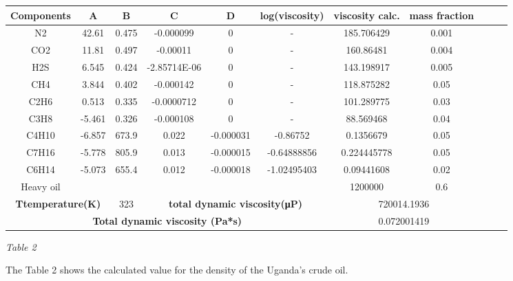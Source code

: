 \documentclass[12pt]{article}
\begin{document}
{\begin{table}[h!]
	\begin{tabular}{|c|c|c|c|c|c|c|c|c|c|c|}
	  \hline
	  \textbf{Components} & \textbf{A} & \textbf{B} & \textbf{C} & \textbf{D} & \textbf{log(viscosity)} & \textbf{viscosity calc.} & \textbf{mass fraction} \\
	  \hline
		N2 & 42.61 & 0.475 & -0.000099 & 0 & - & 185.706429 & 0.001 \\
		\hline
		CO2 & 11.81 & 0.497 & -0.00011 & 0 & - & 160.86481 & 0.004 \\
		\hline
		H2S & 6.545 & 0.424 & -2.85714E-06 & 0 & - & 143.198917 & 0.005 \\
		\hline
		CH4 & 3.844 & 0.402 & -0.000142 & 0 & - & 118.875282 & 0.05 \\
		\hline
		C2H6 & 0.513 & 0.335 & -0.0000712 & 0 & - & 101.289775 & 0.03 \\
		\hline
		C3H8 & -5.461 & 0.326 & -0.000108 & 0 & - & 88.569468 & 0.04 \\
		\hline
		C4H10 & -6.857 & 673.9 & 0.022 & -0.000031 & -0.86752 & 0.1356679 & 0.05 \\
		\hline
		C7H16 & -5.778 & 805.9 & 0.013 & -0.000015 & -0.64888856 & 0.224445778 & 0.05 \\
		\hline
		C6H14 & -5.073 & 655.4 & 0.012 & -0.000018 & -1.02495403 & 0.09441608 & 0.02 \\
		\hline
		Heavy oil & & & & & & 1200000 & 0.6 \\
		\hline
		\multicolumn{2}{|c|}{\textbf{Ttemperature(K)}} & 323 & \multicolumn{3}{|c|}{\textbf{total dynamic viscosity(μP)}} & \multicolumn{2}{|c|}{720014.1936} \\
		\hline
		\multicolumn{6}{|c|}{\textbf{Total dynamic viscosity (Pa*s)}} & 
		\multicolumn{2}{|c|}{0.072001419} \\
		\hline
	\end{tabular}
	\begin{center}
	\textit{Table 2}
	\end{center}
  \end{table}

}

{\fontsize{12pt}{12pt}\selectfont 
\hspace*{1em} The Table 2 shows the calculated value for the density of the Uganda’s crude oil.
}
\end{document}
